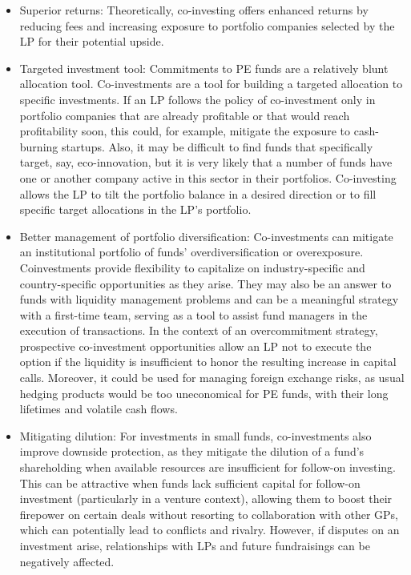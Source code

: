 \documentclass[11pt]{article}
\begin{document}
\begin{itemize}
  \item Superior returns: Theoretically, co-investing offers enhanced returns by reducing fees and increasing exposure to portfolio companies selected by the LP for their potential upside.
  \item Targeted investment tool: Commitments to PE funds are a relatively blunt allocation tool. Co-investments are a tool for building a targeted allocation to specific investments. If an LP follows the policy of co-investment only in portfolio companies that are already profitable or that would reach profitability soon, this could, for example, mitigate the exposure to cash-burning startups. Also, it may be difficult to find funds that specifically target, say, eco-innovation, but it is very likely that a number of funds have one or another company active in this sector in their portfolios. Co-investing allows the LP to tilt the portfolio balance in a desired direction or to fill specific target allocations in the LP's portfolio.
  \item Better management of portfolio diversification: Co-investments can mitigate an institutional portfolio of funds' overdiversification or overexposure. Coinvestments provide flexibility to capitalize on industry-specific and country-specific opportunities as they arise. They may also be an answer to funds with liquidity management problems and can be a meaningful strategy with a first-time team, serving as a tool to assist fund managers in the execution of transactions. In the context of an overcommitment strategy, prospective co-investment opportunities allow an LP not to execute the option if the liquidity is insufficient to honor the resulting increase in capital calls. Moreover, it could be used for managing foreign exchange risks, as usual hedging products would be too uneconomical for PE funds, with their long lifetimes and volatile cash flows.
  \item Mitigating dilution: For investments in small funds, co-investments also improve downside protection, as they mitigate the dilution of a fund's shareholding when available resources are insufficient for follow-on investing. This can be attractive when funds lack sufficient capital for follow-on investment (particularly in a venture context), allowing them to boost their firepower on certain deals without resorting to collaboration with other GPs, which can potentially lead to conflicts and rivalry. However, if disputes on an investment arise, relationships with LPs and future fundraisings can be negatively affected.

\end{itemize}
\end{document}
